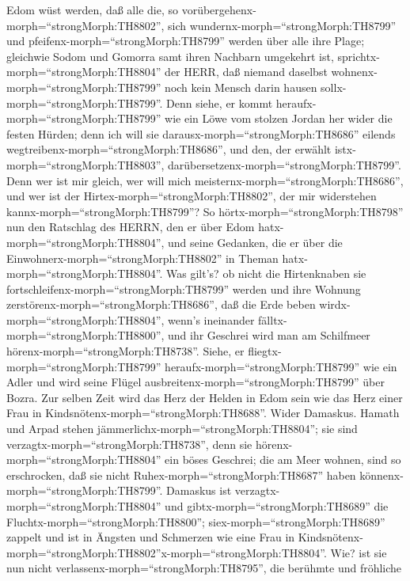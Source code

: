 Edom wüst werden, daß alle die, so
vorübergehenx-morph=``strongMorph:TH8802'', sich
wundernx-morph=``strongMorph:TH8799'' und
pfeifenx-morph=``strongMorph:TH8799'' werden über alle ihre Plage;
 gleichwie Sodom und Gomorra samt ihren Nachbarn umgekehrt
ist, sprichtx-morph=``strongMorph:TH8804'' der HERR, daß niemand
daselbst wohnenx-morph=``strongMorph:TH8799'' noch kein Mensch darin
hausen sollx-morph=``strongMorph:TH8799''.  Denn siehe, er
kommt heraufx-morph=``strongMorph:TH8799'' wie ein Löwe vom stolzen
Jordan her wider die festen Hürden; denn ich will sie
darausx-morph=``strongMorph:TH8686'' eilends
wegtreibenx-morph=``strongMorph:TH8686'', und den, der erwählt
istx-morph=``strongMorph:TH8803'',
darübersetzenx-morph=``strongMorph:TH8799''. Denn wer ist mir gleich,
wer will mich meisternx-morph=``strongMorph:TH8686'', und wer ist der
Hirtex-morph=``strongMorph:TH8802'', der mir widerstehen
kannx-morph=``strongMorph:TH8799''?  So
hörtx-morph=``strongMorph:TH8798'' nun den Ratschlag des HERRN, den er
über Edom hatx-morph=``strongMorph:TH8804'', und seine Gedanken, die er
über die Einwohnerx-morph=``strongMorph:TH8802'' in Theman
hatx-morph=``strongMorph:TH8804''. Was gilt's? ob nicht die Hirtenknaben
sie fortschleifenx-morph=``strongMorph:TH8799'' werden und ihre Wohnung
zerstörenx-morph=``strongMorph:TH8686'',  daß die Erde
beben wirdx-morph=``strongMorph:TH8804'', wenn's ineinander
fälltx-morph=``strongMorph:TH8800'', und ihr Geschrei wird man am
Schilfmeer hörenx-morph=``strongMorph:TH8738''.  Siehe, er
fliegtx-morph=``strongMorph:TH8799''
heraufx-morph=``strongMorph:TH8799'' wie ein Adler und wird seine Flügel
ausbreitenx-morph=``strongMorph:TH8799'' über Bozra. Zur selben Zeit
wird das Herz der Helden in Edom sein wie das Herz einer Frau in
Kindsnötenx-morph=``strongMorph:TH8688''.  Wider Damaskus.
Hamath und Arpad stehen jämmerlichx-morph=``strongMorph:TH8804''; sie
sind verzagtx-morph=``strongMorph:TH8738'', denn sie
hörenx-morph=``strongMorph:TH8804'' ein böses Geschrei; die am Meer
wohnen, sind so erschrocken, daß sie nicht
Ruhex-morph=``strongMorph:TH8687'' haben
könnenx-morph=``strongMorph:TH8799''.  Damaskus ist
verzagtx-morph=``strongMorph:TH8804'' und
gibtx-morph=``strongMorph:TH8689'' die
Fluchtx-morph=``strongMorph:TH8800''; siex-morph=``strongMorph:TH8689''
zappelt und ist in Ängsten und Schmerzen wie eine Frau in
Kindsnötenx-morph=``strongMorph:TH8802''x-morph=``strongMorph:TH8804''.
 Wie? ist sie nun nicht
verlassenx-morph=``strongMorph:TH8795'', die berühmte und fröhliche
